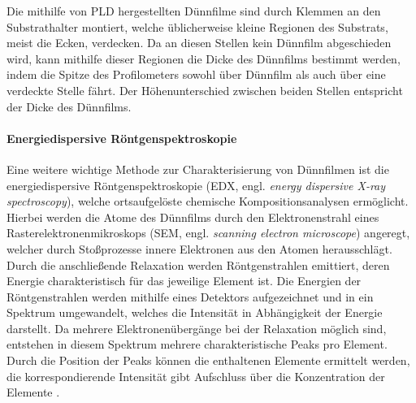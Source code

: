Die mithilfe von PLD hergestellten Dünnfilme sind durch Klemmen an den Substrathalter montiert, welche
üblicherweise kleine Regionen des Substrats, meist die Ecken, verdecken.
Da an diesen Stellen kein Dünnfilm abgeschieden wird, kann mithilfe dieser Regionen die Dicke des
Dünnfilms bestimmt werden, indem die Spitze des Profilometers sowohl über Dünnfilm als auch über eine
verdeckte Stelle fährt.
Der Höhenunterschied zwischen beiden Stellen entspricht der Dicke des Dünnfilms.

\paragraph{Energiedispersive Röntgenspektroskopie}
Eine weitere wichtige Methode zur Charakterisierung von Dünnfilmen ist die energiedispersive Röntgenspektroskopie
(EDX, engl. \textit{energy dispersive X-ray spectroscopy}), welche ortsaufgelöste chemische Kompositionsanalysen
ermöglicht.
Hierbei werden die Atome des Dünnfilms durch den Elektronenstrahl eines Rasterelektronenmikroskops (SEM, engl.
\textit{scanning electron microscope}) angeregt, welcher durch Stoßprozesse innere Elektronen aus den Atomen
herausschlägt.
Durch die anschließende Relaxation werden Röntgenstrahlen emittiert, deren Energie charakteristisch für das jeweilige
Element ist.
Die Energien der Röntgenstrahlen werden mithilfe eines Detektors aufgezeichnet und in ein Spektrum umgewandelt, welches
die Intensität in Abhängigkeit der Energie darstellt.
Da mehrere Elektronenübergänge bei der Relaxation möglich sind, entstehen in diesem Spektrum mehrere charakteristische
Peaks pro Element.
Durch die Position der Peaks können die enthaltenen Elemente ermittelt werden,
die korrespondierende Intensität gibt Aufschluss über die Konzentration der Elemente \autocite{edx}.



